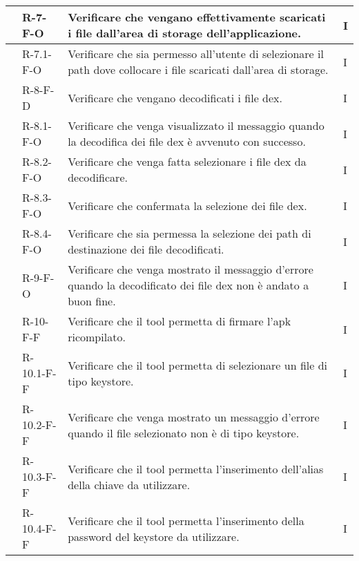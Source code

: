 \begin{center}
\begin{longtable}{ | C{2.5cm} |C{2cm} |C{7cm} |C{1.5cm}|}
         & R-7-F-O    &Verificare che vengano effettivamente scaricati i file dall'area di storage dell'applicazione.& I \\\hline
         & R-7.1-F-O  &Verificare che sia permesso all'utente di selezionare il path dove collocare i file scaricati dall'area di storage.& I \\\hline
         & R-8-F-D    &Verificare che vengano decodificati i file dex.& I \\\hline
         & R-8.1-F-O  &Verificare che venga visualizzato il messaggio quando la decodifica dei file dex è avvenuto con successo.& I \\\hline
         & R-8.2-F-O  &Verificare che venga fatta selezionare i file dex da decodificare.& I \\\hline
         & R-8.3-F-O  &Verificare che confermata la selezione dei file dex.& I \\\hline
         & R-8.4-F-O  &Verificare che sia permessa la selezione dei path di destinazione dei file decodificati.& I \\\hline
         & R-9-F-O    &Verificare che venga mostrato il messaggio d'errore quando la decodificato dei file dex non è andato a buon fine.& I \\\hline
         & R-10-F-F   &Verificare che il tool permetta di firmare l'apk ricompilato.& I \\\hline
         & R-10.1-F-F &Verificare che il tool permetta di selezionare un file di tipo keystore.& I \\\hline
         & R-10.2-F-F &Verificare che venga mostrato un messaggio d'errore quando il file selezionato non è di tipo keystore.& I \\\hline
         & R-10.3-F-F &Verificare che il tool permetta l'inserimento dell'alias della chiave da utilizzare.& I \\\hline
         & R-10.4-F-F &Verificare che il tool permetta l'inserimento della password del keystore da utilizzare.& I \\\hline


\end{longtable}
\end{center}
